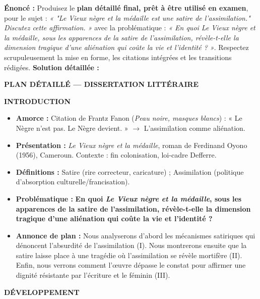 \documentclass[11pt]{article}
\begin{document}
\begin{exoresolu}
\textbf{Énoncé :} Produisez le \textbf{plan détaillé final, prêt à être utilisé en examen}, pour le sujet : \emph{« "Le Vieux nègre et la médaille est une satire de l'assimilation." Discutez cette affirmation. »} avec la problématique : \emph{« En quoi Le Vieux nègre et la médaille, sous les apparences de la satire de l'assimilation, révèle-t-elle la dimension tragique d'une aliénation qui coûte la vie et l'identité ? »}. Respectez scrupuleusement la mise en forme, les citations intégrées et les transitions rédigées.
\tcblower
\textbf{Solution détaillée :}

\textbf{PLAN DÉTAILLÉ — DISSERTATION LITTÉRAIRE}

\textbf{INTRODUCTION}
\begin{itemize}
    \item \textbf{Amorce :} Citation de Frantz Fanon (\emph{Peau noire, masques blancs}) : « Le Nègre n'est pas. Le Nègre devient. » $\to$ L'assimilation comme aliénation.
    \item \textbf{Présentation :} \emph{Le Vieux nègre et la médaille}, roman de Ferdinand Oyono (1956), Cameroun. Contexte : fin colonisation, loi-cadre Defferre.
    \item \textbf{Définitions :} Satire (rire correcteur, caricature) ; Assimilation (politique d'absorption culturelle/francisation).
    \item \textbf{Problématique :} \textbf{En quoi \emph{Le Vieux nègre et la médaille}, sous les apparences de la satire de l'assimilation, révèle-t-elle la dimension tragique d'une aliénation qui coûte la vie et l'identité ?}
    \item \textbf{Annonce de plan :} Nous analyserons d'abord les mécanismes satiriques qui dénoncent l'absurdité de l'assimilation (I). Nous montrerons ensuite que la satire laisse place à une tragédie où l'assimilation se révèle mortifère (II). Enfin, nous verrons comment l'œuvre dépasse le constat pour affirmer une dignité résistante par l'écriture et le féminin (III).
\end{itemize}

\textbf{DÉVELOPPEMENT}


\end{exoresolu}
\end{document}
